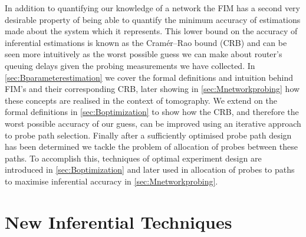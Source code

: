 In addition to quantifying our knowledge of a network the FIM has a second very desirable property of being able to quantify the minimum accuracy of estimations made about the system which it represents. This lower bound on the accuracy of inferential estimations is known as the Cramér–Rao bound (CRB) and can be seen more intuitively as the worst possible guess we can make about router's queuing delays given the probing measurements we have collected. In \cref{sec:Bparameterestimation} we cover the formal definitions and intuition behind FIM's and their corresponding CRB, later showing in \cref{sec:Mnetworkprobing} how these concepts are realised in the context of tomography. We extend on the formal definitions in \cref{sec:Boptimization} to show how the CRB, and therefore the worst possible accuracy of our guess, can be improved using an iterative approach to probe path selection. Finally after a sufficiently optimised probe path design has been determined we tackle the problem of allocation of probes between these paths. To accomplish this, techniques of optimal experiment design \cite{anthony_c_optimum_1996} are introduced in \cref{sec:Boptimization} and later used in allocation of probes to paths to maximise inferential accuracy in \cref{sec:Mnetworkprobing}.\par

\section{New Inferential Techniques}
\label{sec:Iinferentialtechniques}

